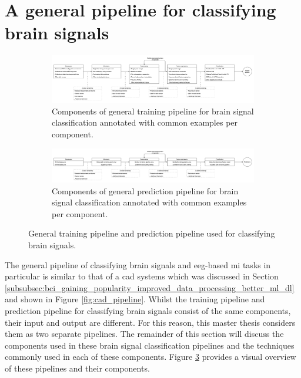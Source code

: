 \section{A general pipeline for classifying brain signals}
\label{sec:processing_signals_general_pipeline}

\begin{figure}
    \centering
    \begin{subfigure}{\textwidth}
        \centering
        \includegraphics[width=\textwidth]{../images/pipeline/brain_signal_pipeline_training.pdf}
        \captionsetup{width=0.9\linewidth}
        \captionsetup{justification=centering}
        \caption{Components of general training pipeline for brain signal classification annotated with common examples per component.}
        \label{fig:processing_signals_pipeline_ml}
    \end{subfigure}
    \hfill
    \begin{subfigure}{\textwidth}
        \centering
        \includegraphics[width=\textwidth]{../images/pipeline/brain_signal_pipeline_predicting.pdf}
        \captionsetup{width=0.9\linewidth}
        \captionsetup{justification=centering}
        \caption{Components of general prediction pipeline for brain signal classification annotated with common examples per component.}
        \label{fig:processing_signals_pipeline_dl}
    \end{subfigure}
    \captionsetup{width=0.9\linewidth}
    \captionsetup{justification=centering}
    \caption{General training pipeline and prediction pipeline used for classifying brain signals.}
    \label{fig:processing_signals_pipeline}
\end{figure}

The general pipeline of classifying brain signals and \gls{eeg}-based \gls{mi} tasks in particular is similar to that of a \gls{cad} systems which was discussed in Section \ref{subsubsec:bci_gaining_popularity_improved_data_processing_better_ml_dl} and shown in Figure \ref{fig:cad_pipeline}.
Whilst the training pipeline and prediction pipeline for classifying brain signals consist of the same components, their input and output are different.
For this reason, this master thesis considers them as two separate pipelines.
The remainder of this section will discuss the components used in these brain signal classification pipelines and the techniques commonly used in each of these components.
Figure \ref{fig:processing_signals_pipeline} provides a visual overview of these pipelines and their components.


